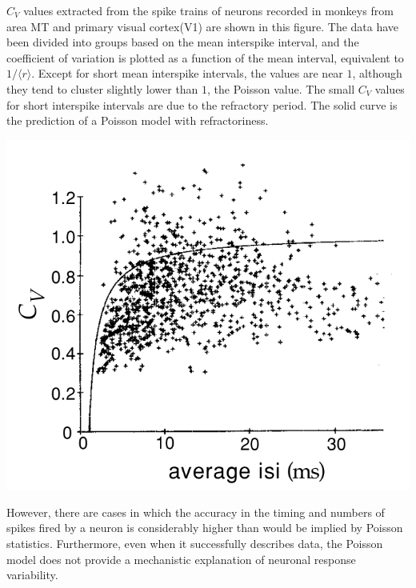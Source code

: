 \begin{exm}
  $C_V$ values extracted from the spike trains of neurons recorded in monkeys from area MT and primary visual cortex(V1) are shown in this figure. The data have been divided into groups based on the mean interspike interval,  and the coefficient of variation is plotted as a function of the mean interval,  equivalent to $1/\langle r\rangle$. Except for short mean interspike intervals, the values are near $1$, although they tend to cluster slightly lower than $1$, the Poisson value. The small $C_V$ values for short interspike intervals are due to the refractory period. The solid curve is the prediction of a Poisson  model with refractoriness.
  \begin{center}
    \label{fig:1.16}    
    \includegraphics[scale = 0.25]{png/Figure1-16.png}\\
  \end{center}
\end{exm}

\begin{rem}
    However,  there are cases in which the accuracy in the timing and numbers of spikes fired by a neuron is considerably higher than would be implied by Poisson statistics. 
    Furthermore,  even when it successfully describes data,  the Poisson model does not provide a mechanistic explanation of neuronal response variability.
\end{rem}

